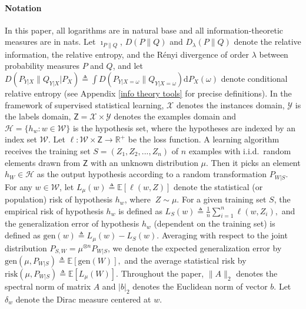 \documentclass{article}
\newcommand{\E}{\mathbb{E}}
\newcommand{\gen}{\mathrm{gen}}
\newcommand{\risk}[0]{\mathrm{risk}}
\newcommand{\W}[0]{\mathcal{W}}
\begin{document}
\paragraph{Notation}
In this paper, all logarithms are in natural base and all information-theoretic measures are in nats. Let $\imath_{P\|Q}$, $D(P\|Q)$ and $D_{\lambda}(P\|Q)$ denote the relative information, the relative entropy, and the R\'{e}nyi divergence of order $\lambda$ between probability measures $P$ and $Q$, and let $D(P_{Y|X}\|Q_{Y|X}|P_X)\triangleq \int D(P_{Y|X=\omega}\|Q_{Y|X=\omega})\mathrm{d}P_X(\omega)$ denote conditional relative entropy (see Appendix \ref{info theory tools} for precise definitions). 
In the framework of supervised statistical learning, $\mathcal{X}$ denotes the instances domain, $\mathcal{Y}$ is the labels domain, $\mathsf{Z}=\mathcal{X}\times \mathcal{Y}$ denotes the examples domain and $\mathcal{H}=\{h_w : w\in \mathcal{W}\}$ is the hypothesis set, where the hypotheses are indexed by an index set $\mathcal{W}$. Let $\ell:\W\times \mathsf{Z}\to \mathbb{R}^+$ be the loss function. A learning algorithm receives the training set $S=(Z_1,Z_2,...,Z_n)$ of $n$ examples with i.i.d.\ random elements drawn from $\mathsf{Z}$ with an unknown distribution $\mu$. Then it picks an element $h_W\in\mathcal{H}$ as the output hypothesis according to a random transformation $P_{W|S}$. For any $w\in\mathcal{W}$, let 
$
L_{\mu}(w)\triangleq \E[\ell(w,Z)] 
$
denote the statistical (or population) risk of hypothesis $h_w$, where $~ Z\sim \mu$. For a given training set $S$, the empirical risk of hypothesis $h_w$ is defined as 
$
L_{S}(w)\triangleq \frac{1}{n}\sum_{i=1}^n \ell(w,Z_i),
$
and the generalization error of hypothesis $h_w$ (dependent on the training set) is defined as
$
\mathrm{gen}(w)\triangleq L_{\mu}(w)-L_S(w).
$
Averaging with respect to the joint distribution $P_{S,W}=\mu^{\otimes n}P_{W|S}$, we denote the expected generalization error  
by
$
\mathrm{gen}(\mu, P_{W|S})\triangleq \E [\gen(W)],
$
and the average statistical risk by  
$
	\risk(\mu, P_{W|S})\triangleq \E[L_{\mu}(W)].
$    
Throughout the paper, $\|A\|_2$ denotes the spectral norm of matrix $A$ and $|b|_2$ denotes the Euclidean norm of vector $b$. Let $\delta_w$ denote the Dirac measure centered at $w$.
\end{document}
